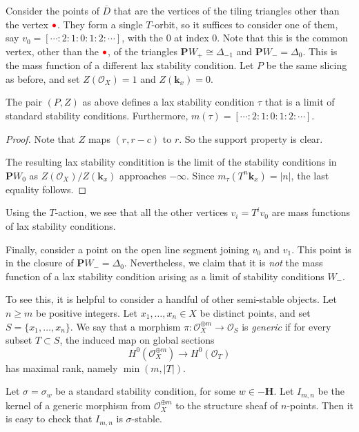 \documentclass{amsart}
\begin{document}
Consider the points of \(\overline D\) that are the vertices of the tiling triangles other than the vertex \(\textcolor{red}{\bullet}\).
They form a single \(T\)-orbit, so it suffices to consider one of them, say \(v_0 = [\cdots : 2:1:0:1:2: \cdots]\), with the \(0\) at index \(0\).
Note that this is the common vertex, other than the \(\textcolor{red}{\bullet}\), of the triangles \(\mathbf{P}W_{+} \cong \Delta_{-1}\) and \(\mathbf{P}W_- = \Delta_0\).
This is the mass function of a different lax stability condition.
Let \(P\) be the same slicing as before, and set \(Z(\mathcal{O}_X) = 1\) and \(Z(\mathbf{k}_x) = 0\).
\begin{proposition}\label{prop:v0}
  The pair \((P,Z)\) as above defines a lax stability condition \(\tau\) that is a limit of standard stability conditions.
  Furthermore, \(m(\tau) = [\cdots : 2: 1 : 0: 1 : 2: \cdots]\).
\end{proposition}
\begin{proof}
  Note that \(Z\) maps \((r,r-c)\) to \(r\).
  So the support property is clear.

  The resulting lax stability conditition is the limit of the stability conditions in \(\mathbf{P}W_0\) as \(Z(\mathcal{O}_X)/Z(\mathbf{k}_x)\) approaches \(-\infty\).
  Since \(m_{\tau}(T^n \mathbf{k}_x) = |n|\), the last equality follows.
\end{proof}

Using the \(T\)-action, we see that all the other vertices \(v_i = T^iv_0\) are mass functions of lax stability conditions.

Finally, consider a point on the open line segment joining \(v_{0}\) and \(v_{1}\).
This point is in the closure of \(\mathbf{P}W_- = \Delta_0\).
Nevertheless, we claim that it is \emph{not} the mass function of a lax stability condition arising as a limit of stability conditions \(W_-\).

To see this, it is helpful to consider a handful of other semi-stable objects.
Let \(n \geq m\) be positive integers.
Let \(x_1, \dots, x_n \in X\) be distinct points, and set \(S = \{x_1, \dots, x_n\}\).
We say that a morphism \( \pi \colon \mathcal{O}_X^{\oplus m} \to \mathcal{O}_S\) is \emph{generic} if for every subset \(T \subset S\), the induced map on global sections
\[ H^0(\mathcal{O}_X^{\oplus m}) \to H^0(\mathcal{O}_T)\]
has maximal rank, namely \(\min(m, |T|)\).

Let \(\sigma = \sigma_w\) be a standard stability condition, for some \(w \in -\mathbf{H}\).
Let \(I_{m,n}\) be the kernel of a generic morphism from \(\mathcal{O}_X^{\oplus m}\) to the structure sheaf of \(n\)-points.
Then it is easy to check that \(I_{m,n}\) is \(\sigma\)-stable.
\end{document}
